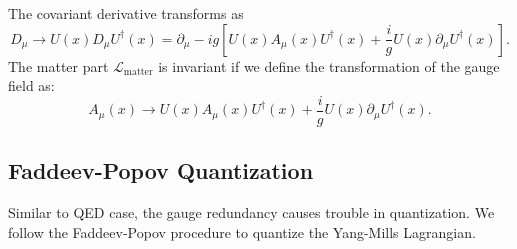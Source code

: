 The covariant derivative transforms as
\begin{equation}
	D_\mu \rightarrow U(x) D_\mu U^\dagger(x)
	=\partial_\mu - i g \left[U(x) A_\mu(x) U^\dagger(x) + \frac{i}{g} U(x)\partial_\mu U^\dagger(x)\right].
\end{equation}
The matter part $\mathcal L_{\mathrm{matter}}$ is invariant if we define the transformation of the gauge field as:
\begin{equation}\label{eq:SM-YM-GT-1}
	A_\mu(x) \rightarrow U(x) A_\mu(x) U^\dagger(x) + \frac{i}{g} U(x)\partial_\mu U^\dagger(x).
\end{equation}



\subsection{Faddeev-Popov Quantization}
Similar to QED case, the gauge redundancy causes trouble in quantization.
We follow the Faddeev-Popov procedure to quantize the Yang-Mills Lagrangian.

